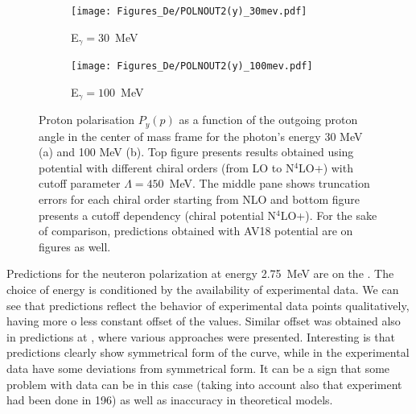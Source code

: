    \begin{figure}[h]
        \centering
        \begin{subfigure}[b]{0.46\textwidth}
            \texttt{[image: Figures\_De/POLNOUT2(y)\_30mev.pdf]}
            \caption{\small E$_\gamma = 30$~MeV}
            \label{PY_30_vert}
        \end{subfigure}
        \begin{subfigure}[b]{0.46\textwidth}
            \texttt{[image: Figures\_De/POLNOUT2(y)\_100mev.pdf]}
            \caption{\small E$_\gamma = 100$~MeV}
            \label{PY_100_vert}
        \end{subfigure}
        \caption{Proton polarisation $P_y(p)$ 
        \label{PY_30_100_vert}
        as a function of the outgoing proton angle in the center of mass frame 
        for the photon's energy 30 MeV (a) and 100 MeV (b).
        Top figure presents results obtained using potential
        with different chiral orders (from LO to N$^4$LO+) with cutoff parameter $\Lambda=450$~MeV.
        The middle pane shows truncation errors for each 
        chiral order starting from NLO and
        bottom figure presents a cutoff dependency (chiral potential N$^4$LO+).
        For the sake of comparison, predictions obtained with AV18 potential are on  figures as well.}
    \end{figure}


    Predictions for the neuteron polarization at energy 2.75~MeV are on the
    . The choice of energy is conditioned by the availability of experimental data.
    We can see that predictions reflect the behavior of experimental data points qualitatively,
    having more o less constant offset of the values. Similar offset was obtained
    also in predictions at \cite{ArenhovelPhotodisint1991}, where various approaches were presented.
    Interesting is that predictions clearly show symmetrical form of the curve, while in the experimental data
    have some deviations from symmetrical form. It can be a sign that some problem with data can be
    in this case (taking into account also that experiment had been done in 196) as well 
    as inaccuracy in theoretical models.

